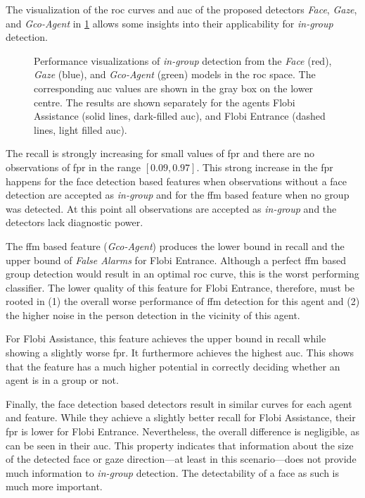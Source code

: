 The visualization of the \gls{roc} curves and \gls{auc} of the proposed detectors \emph{Face}, \emph{Gaze}, and \emph{Gco-Agent} in \cref{fig:group-roc-models} allows some insights into their applicability for \emph{in-group} detection.
\begin{figure}[htb]
    \centering
    
    \caption[ROC curves for \emph{in-group} detectors.]{\label{fig:group-roc-models}
    Performance visualizations of \emph{in-group} detection from the \emph{Face} (red), \emph{Gaze} (blue), and \emph{Gco-Agent} (green) models in the \gls{roc} space.
    The corresponding \gls{auc} values are shown in the gray box on the lower centre.
    The results are shown separately for the agents \gls{Flobi Assistance} (solid lines, dark-filled \gls{auc}), and \gls{Flobi Entrance} (dashed lines, light filled \gls{auc}).
    }
\end{figure}
\begin{enumerate*}[label=(\roman*)]
    \item The \gls{recall} is strongly increasing for small values of \gls{fpr} and there are no observations of \gls{fpr} in the range \([0.09,0.97]\).
    This strong increase in the \gls{fpr} happens for the face detection based features when observations without a face detection are accepted as \emph{in-group} and for the \gls{ffm} based feature when no group was detected.
    At this point all observations are accepted as \emph{in-group} and the detectors lack diagnostic power.
    \item The \gls{ffm} based feature (\emph{Gco-Agent}) produces the lower bound in recall and the upper bound of \emph{False Alarms} for \gls{Flobi Entrance}.
    Although a perfect \gls{ffm} based group detection would result in an optimal \gls{roc} curve, this is the worst performing classifier.
    The lower quality of this feature for \gls{Flobi Entrance}, therefore, must be rooted in (1) the overall worse performance of \gls{ffm} detection for this agent and (2) the higher noise in the person detection in the vicinity of this agent.
    \item For \gls{Flobi Assistance}, this feature achieves the upper bound in \gls{recall} while showing a slightly worse \gls{fpr}.
    It furthermore achieves the highest \gls{auc}.
    This shows that the feature has a much higher potential in correctly deciding whether an agent is in a group or not.
    \item Finally, the face detection based detectors result in similar curves for each agent and feature.
    While they achieve a slightly better recall for \gls{Flobi Assistance}, their \gls{fpr} is lower for \gls{Flobi Entrance}.
    Nevertheless, the overall difference is negligible, as can be seen in their \gls{auc}.
    This property indicates that information about the size of the detected face or gaze direction---at least in this scenario---does not provide much information to \emph{in-group} detection.
    The detectability of a face as such is much more important.
\end{enumerate*}

